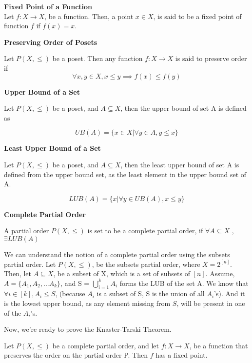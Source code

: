 \textbf{Fixed Point of a Function}\\
Let $f: X \to X$, be a function. Then, a point $x \in X$, is said to be a fixed point of function $f$ if $f(x) = x$.

\textbf{Preserving Order of Posets}

Let $P(X,\le)$ be a poset. Then any function $f: X \to X$ is said to preserve order if 
$$ \forall x,y \in X, x \le y \implies f(x)  \le f(y) $$

\textbf{Upper Bound of a Set}

Let $P(X,\le)$ be a poset, and $A \subseteq X$, then the upper bound of set A is defined as 

$$ UB(A) = \{x \in X | \forall y \in A, y \le x\} $$

\textbf{Least Upper Bound of a Set}

Let $P(X,\le)$ be a poset, and $A \subseteq X$, then the least upper bound of set A is defined from the upper bound set, as the least element in the upper bound set of A.

$$ LUB(A) = \{x  | \forall y \in UB(A), x \le y\} $$

\textbf{Complete Partial Order}

A partial order $P(X,\le)$ is set to be a complete partial order, if $\forall A \subseteq X$ , $\exists LUB(A)$

\medskip


We can understand the notion of a complete partial order using the subsets partial order. Let $P(X,\le)$, be the subsets partial order, where $X = 2^{[n]}$. Then, let $A \subseteq X$, be a subset of X, which is a set of subsets of $[n]$. Assume, $A = \{A_1,A_2,...A_k\}$, and S =  $\bigcup_{i=1}^{k} A_{i}$ forms the LUB of the set A. We know that $\forall i \in [k], A_i \le S$, (because $A_i$ is a subset of S, S is the union of all $A_i$'s). And it is the lowest upper bound, as any element missing from $S$, will be present in one of the $A_i$'s.

Now, we're ready to prove the Knaster-Tarski Theorem.

\begin{theorem}
Let $P(X,\le)$ be a complete partial order, and let $f: X \to X$, be a function that preserves the order on the partial order P. Then $f$ has a fixed point.
\end{theorem}

